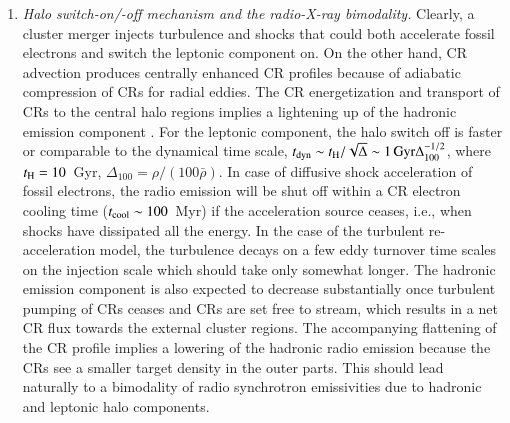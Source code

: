 \documentclass[useAMS,usenatbib]{mn2e}
\begin{document}
\begin{enumerate}
\item {\em Halo switch-on/-off mechanism and the radio-X-ray bimodality.}
  Clearly, a cluster merger injects turbulence and shocks that could both
  accelerate fossil electrons and switch the leptonic component on. On the other
  hand, CR advection produces centrally enhanced CR profiles because of adiabatic
  compression of CRs for radial eddies. The CR energetization and transport of
  CRs to the central halo regions implies a lightening up of the hadronic
  emission component \citep{2011A&A...527A..99E}. For the leptonic component,
  the halo switch off is faster or comparable to the dynamical time scale,
  $t_{\rm dyn} \sim t_{\rm H}/\sqrt{\Delta} \sim 1 \,{\mathrm{Gyr}}
  \Delta_{100}^{-1/2}$, where $t_{\rm H}=10$~Gyr,
  $\Delta_{100}=\rho/(100\bar{\rho})$. In case of diffusive shock acceleration
  of fossil electrons, the radio emission will be shut off within a CR electron
  cooling time ($t_{\mathrm{cool}}\sim100$~Myr) if the acceleration source ceases,
  i.e., when shocks have dissipated all the energy. In the case of the turbulent
  re-acceleration model, the turbulence decays on a few eddy turnover time
  scales on the injection scale which should take only somewhat longer. The
  hadronic emission component is also expected to decrease substantially once
  turbulent pumping of CRs ceases and CRs are set free to stream, which results
  in a net CR flux towards the external cluster regions. The accompanying
  flattening of the CR profile implies a lowering of the hadronic radio emission
  because the CRs see a smaller target density in the outer parts. This should
  lead naturally to a bimodality of radio synchrotron emissivities due to
  hadronic and leptonic halo components.
\end{enumerate}
\end{document}
